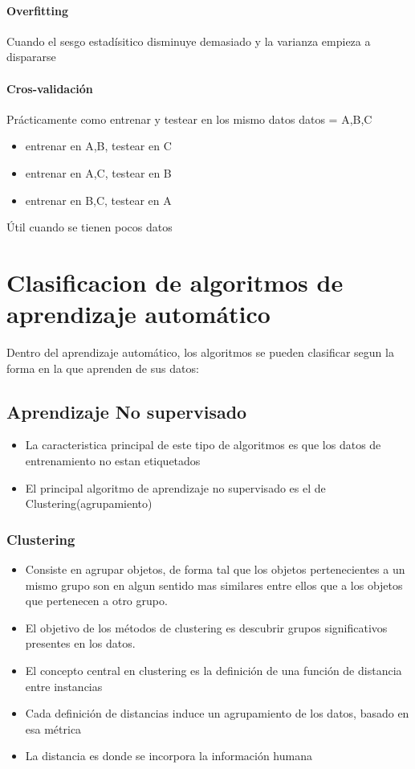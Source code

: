 \documentclass[a4paper,12pt,spanish]{book}
\begin{document}
	\paragraph {Overfitting}
	  Cuando el sesgo estadísitico disminuye demasiado y la varianza empieza a dispararse

	\paragraph {Cros-validación}
	  Prácticamente como entrenar y testear en los mismo datos
	  datos = {A,B,C}
	  \begin{itemize}
	    \item entrenar en A,B, testear en C
	    \item entrenar en A,C, testear en B
	    \item entrenar en B,C, testear en A
	  \end{itemize}
	  Útil cuando se tienen pocos datos

  \section{Clasificacion de algoritmos de aprendizaje automático}
    Dentro del aprendizaje automático, los algoritmos se pueden clasificar segun la forma en la que aprenden de sus datos:

    \subsection{Aprendizaje No supervisado} 
      \begin{itemize}
	\item La caracteristica principal de este tipo de algoritmos es que los datos de entrenamiento no estan etiquetados
	\item El principal algoritmo de aprendizaje no supervisado es el de Clustering(agrupamiento)
      \end{itemize}
      \subsubsection {Clustering}
	\begin{itemize}
	  \item Consiste en agrupar objetos, de forma tal que los objetos pertenecientes a un mismo grupo son en algun sentido mas similares entre ellos que a los objetos que pertenecen a otro grupo.
	  \item El objetivo de los métodos de clustering es descubrir grupos significativos presentes en los datos.
	  \item El concepto central en clustering es la definición de una función de distancia entre instancias
	  \item Cada definición de distancias induce un agrupamiento de los datos, basado en esa métrica
	  \item La distancia es donde se incorpora la información humana
	\end{itemize}
\end{document}
